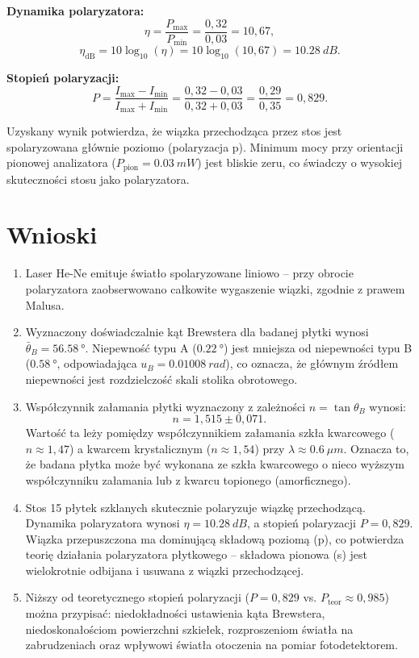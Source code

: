 \documentclass[a4paper,12pt]{article}
\begin{document}
\textbf{Dynamika polaryzatora:}
\[
\eta = \frac{P_{\max}}{P_{\min}} = \frac{0{,}32}{0{,}03} = 10{,}67,
\]
\[
\eta_{\text{dB}} = 10\log_{10}(\eta) = 10\log_{10}(10{,}67) = \SI{10,28}{dB}.
\]

\textbf{Stopień polaryzacji:}
\[
P = \frac{I_{\max} - I_{\min}}{I_{\max} + I_{\min}}
= \frac{0{,}32 - 0{,}03}{0{,}32 + 0{,}03}
= \frac{0{,}29}{0{,}35} = 0{,}829.
\]

Uzyskany wynik potwierdza, że wiązka przechodząca przez stos jest spolaryzowana głównie
poziomo (polaryzacja p). Minimum mocy przy orientacji pionowej analizatora
($P_{\text{pion}} = \SI{0,03}{mW}$) jest bliskie zeru, co świadczy o wysokiej
skuteczności stosu jako polaryzatora.

\section*{Wnioski}

\begin{enumerate}
  \item Laser He-Ne emituje światło spolaryzowane liniowo -- przy obrocie polaryzatora
  zaobserwowano całkowite wygaszenie wiązki, zgodnie z prawem Malusa.

  \item Wyznaczony doświadczalnie kąt Brewstera dla badanej płytki wynosi
  $\bar{\theta}_B = \SI{56,58}{\degree}$. Niepewność typu A ($\SI{0,22}{\degree}$)
  jest mniejsza od niepewności typu B ($\SI{0,58}{\degree}$, odpowiadająca
  $u_B = \SI{0,01008}{rad}$), co oznacza, że głównym źródłem niepewności jest
  rozdzielczość skali stolika obrotowego.

  \item Współczynnik załamania płytki wyznaczony z zależności $n = \tan\theta_B$ wynosi:
  \[
  n = 1{,}515 \pm 0{,}071 .
  \]
  Wartość ta leży pomiędzy współczynnikiem załamania szkła kwarcowego ($n \approx 1{,}47$)
  a kwarcem krystalicznym ($n \approx 1{,}54$) przy $\lambda \approx \SI{0,6}{\mu m}$.
  Oznacza to, że badana płytka może być wykonana ze szkła kwarcowego o nieco wyższym
  współczynniku załamania lub z kwarcu topionego (amorficznego).

  \item Stos 15 płytek szklanych skutecznie polaryzuje wiązkę przechodzącą. Dynamika
  polaryzatora wynosi $\eta = \SI{10,28}{dB}$, a stopień polaryzacji $P = 0{,}829$.
  Wiązka przepuszczona ma dominującą składową poziomą (p), co potwierdza teorię
  działania polaryzatora płytkowego -- składowa pionowa (s) jest wielokrotnie odbijana
  i usuwana z wiązki przechodzącej.

  \item Niższy od teoretycznego stopień polaryzacji ($P = 0{,}829$ vs. $P_{\text{teor}}
  \approx 0{,}985$) można przypisać: niedokładności ustawienia kąta Brewstera,
  niedoskonałościom powierzchni szkiełek, rozproszeniom światła na zabrudzeniach
  oraz wpływowi światła otoczenia na pomiar fotodetektorem.
\end{enumerate}
\end{document}
